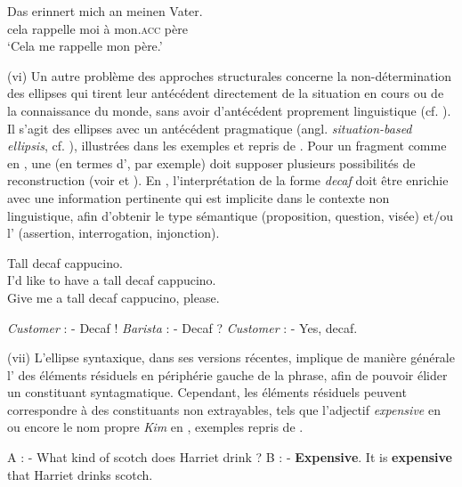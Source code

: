 \ex
\gll  Das  erinnert  mich  an  meinen  Vater.\label{ch1:ex135c}\\
  cela  rappelle  moi  à  mon.\textsc{acc}  père  \\
\glt ‘Cela me rappelle mon père.’ 
\z
\z

(vi) Un autre problème des approches structurales concerne la non-détermina\-tion des ellipses qui tirent leur antécédent directement de la situation en cours ou de la connaissance du monde, sans avoir d’antécédent proprement linguistique (cf. ). Il s’agit des ellipses avec un antécédent pragmatique (angl. \textit{situation-based ellipsis}, cf. \citealt{Reich2011}), illustrées dans les exemples  et  repris de \citet{Reich2011}. Pour un fragment comme en , une  (en termes d’, par exemple) doit supposer plusieurs possibilités de reconstruction (voir  et ). En , l’interprétation de la forme \textit{decaf} doit être enrichie avec une information pertinente qui est implicite dans le contexte non linguistique, afin d’obtenir le type sémantique (proposition, question, visée) et/ou l’ (assertion, interrogation, injonction).

\ea \label{ch1:ex136}
  Tall decaf cappucino. \\
\ea  I’d like to have a tall decaf cappucino. \label{ch1:ex136a}\\
\ex  Give me a tall decaf cappucino, please. \label{ch1:ex136b} \\
\z
\z

\ea \label{ch1:ex137}
\ea  \textit{Customer} : - Decaf ! 
\ex  \textit{Barista} : - Decaf ?
\ex  \textit{Customer} : - Yes, decaf. 
\z
\z

(vii) L’ellipse syntaxique, dans ses versions récentes, implique de manière géné\-rale l’ des éléments résiduels en périphérie gauche de la phrase, afin de pouvoir élider un constituant syntagmatique. Cependant, les éléments résiduels peuvent correspondre à des constituants non extrayables, tels que l’adjectif \textit{expensive} en  ou encore le nom propre \textit{Kim} en , exemples repris de \citet{CulicoverEtAl2005}. 

\ea
\ea  A : - What kind of scotch does Harriet drink ? B : - \textbf{Expensive}. 
\ex  *It is \textbf{expensive} that Harriet drinks scotch. \label{ch1:ex138b}  
\z
\z


